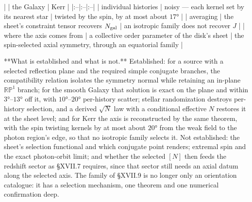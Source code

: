 | | the Galaxy | Kerr |
|:--|:--|:--|
| individual histories | noisy — each kernel set by its nearest star | twisted by the spin, by at most about $17°$ |
| averaging | the sheet's constraint tensor recovers $N_{\rm gal}$ | an isotropic family does not recover $J$ |
| where the axis comes from | a collective order parameter of the disk's sheet | the spin-selected axial symmetry, through an equatorial family |



**What is established and what is not.** Established: for a source with a selected reflection plane and the required simple conjugate branches, the compatibility relation isolates the symmetry normal while retaining an in-plane $\mathbb{RP}^1$ branch; for the smooth Galaxy that solution is exact on the plane and within $3°$–$13°$ off it, with $10°$–$20°$ per-history scatter; stellar randomization destroys per-history selection, and a derived $\sqrt N$ law with a conditional effective $N$ restores it at the sheet level; and for Kerr the axis is reconstructed by the same theorem, with the spin twisting kernels by at most about $20°$ from the weak field to the photon region's edge, so that no isotropic family selects it. Not established: the sheet's selection functional and which conjugate point renders; extremal spin and the exact photon-orbit limit; and whether the selected $[N]$ then feeds the redshift sector as §XVII.7 requires, since that sector still needs an axial datum along the selected axis. The family of §XVII.9 is no longer only an orientation catalogue: it has a selection mechanism, one theorem and one numerical confirmation deep.


